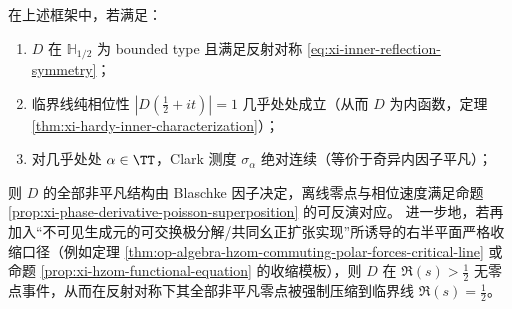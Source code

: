 \begin{theorem}\label{thm:xi-rh-sufficient-template-inner-clark-conservative}
在上述框架中，若满足：
\begin{enumerate}
  \item \(D\) 在 \(\mathbb{H}_{1/2}\) 为 bounded type 且满足反射对称 \eqref{eq:xi-inner-reflection-symmetry}；
  \item 临界线纯相位性 \(|D(\tfrac12+it)|=1\) 几乎处处成立（从而 \(D\) 为内函数，定理 \ref{thm:xi-hardy-inner-characterization}）；
  \item 对几乎处处 \(\alpha\in\TT\)，Clark 测度 \(\sigma_\alpha\) 绝对连续（等价于奇异内因子平凡）；
\end{enumerate}
则 \(D\) 的全部非平凡结构由 Blaschke 因子决定，离线零点与相位速度满足命题 \ref{prop:xi-phase-derivative-poisson-superposition} 的可反演对应。
进一步地，若再加入“不可见生成元的可交换极分解/共同幺正扩张实现”所诱导的右半平面严格收缩口径（例如定理 \ref{thm:op-algebra-hzom-commuting-polar-forces-critical-line} 或命题 \ref{prop:xi-hzom-functional-equation} 的收缩模板），则 \(D\) 在 \(\Re(s)>\tfrac12\) 无零点事件，从而在反射对称下其全部非平凡零点被强制压缩到临界线 \(\Re(s)=\tfrac12\)。
\end{theorem}

\endinput

